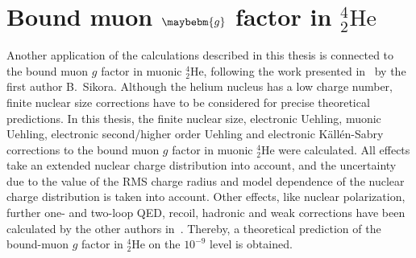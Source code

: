 \chapter{Bound muon $\maybebm{g}$ factor in $^4_2\text{He}$}
\label{sec:muon_he}

Another application of the calculations described in this thesis is connected to the bound muon $g$ factor in muonic $^4_2$He, following the work presented in~\cite{sikora2018} by the first author B.~Sikora. Although the helium nucleus has a low charge number, finite nuclear size corrections have to be considered for precise theoretical predictions. In this thesis, the finite nuclear size, electronic Uehling, muonic Uehling, electronic second/higher order Uehling and electronic Källén-Sabry corrections to the bound muon $g$ factor in muonic $^4_2$He were calculated. All effects take an extended nuclear charge distribution into account, and the uncertainty due to the value of the RMS charge radius and model dependence of the nuclear charge distribution is taken into account. 
Other effects, like nuclear polarization, further one- and two-loop QED, recoil, hadronic and weak corrections have been calculated by the other authors in~\cite{sikora2018}. Thereby, a theoretical prediction of the bound-muon $g$ factor in $^4_2$He on the $10^{-9}$ level is obtained.

